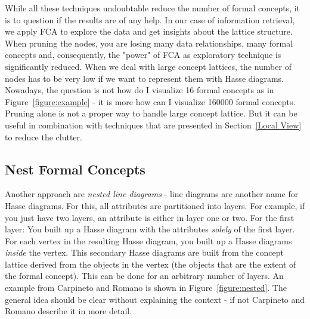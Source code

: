 \documentclass[11pt]{report}
\begin{document}
	While all these techniques undoubtable reduce the number of formal concepts, it is to question if the results are of any help. In our case of information retrieval, we apply FCA to explore the data and get insights about the lattice structure. When pruning the nodes, you are losing many data relationships, many formal concepts and, consequently, the "power" of FCA as exploratory technique is significantly reduced. When we deal with large concept lattices, the number of nodes has to be very low if we want to represent them with Hasse diagrams. Nowadays, the question is not how do I visualize 16 formal concepts as in Figure~\ref{figure:example} - it is more how can I visualize 160000 formal concepts.\\
	
	Pruning alone is not a proper way to handle large concept lattice. But it can be useful in combination with techniques that are presented in Section~\ref{Local View} to reduce the clutter.
\subsection{Nest Formal Concepts}	

Another approach are \textit{nested line diagrams} - line diagrams are another name for Hasse diagrams. For this, all attributes are partitioned into layers. For example, if you just have two layers, an attribute is either in layer one or two. For the first layer: You built up a Hasse diagram with the attributes \textit{solely} of the first layer. For each vertex in the resulting Hasse diagram, you built up a Hasse diagrams \textit{inside} the vertex. This secondary Hasse diagrams are built from the concept lattice derived from the objects in the vertex (the objects that are the extent of the formal concept). This can be done for an arbitrary number of layers. An example from Carpineto and Romano \cite{carpineto2004concept} is shown in Figure~\ref{figure:nested}. The general idea should be clear without explaining the context - if not Carpineto and Romano \cite{carpineto2004concept} describe it in more detail. \\
\end{document}
